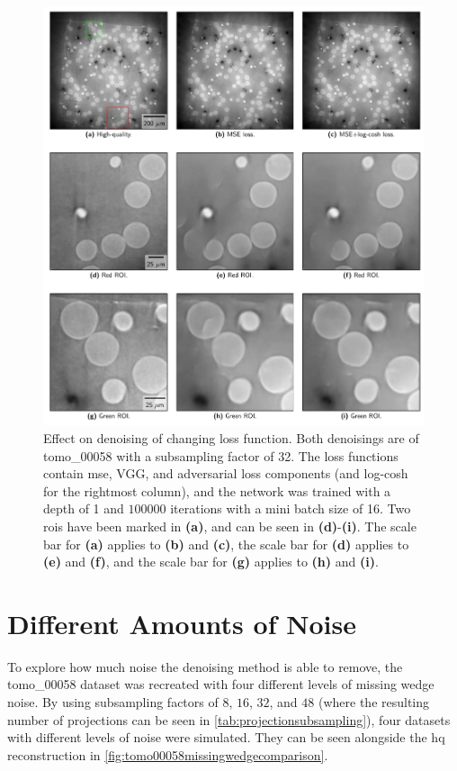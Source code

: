 \begin{figure}[htbp]
  \centering
  \includegraphics[width=.9\textwidth]{figures/losschangedenoisingcomparison.pdf}
  \caption[Effect on denoising of changing loss function]{Effect on denoising of changing loss function. Both denoisings are of tomo\_00058 with a subsampling factor of 32. The loss functions contain \acrshort{mse}, VGG, and adversarial loss components (and log-cosh for the rightmost column), and the network was trained with a depth of 1 and $100000$ iterations with a mini batch size of 16. Two \acrshort{roi}s have been marked in \textbf{(a)}, and can be seen in \textbf{(d)}-\textbf{(i)}. The scale bar for \textbf{(a)} applies to \textbf{(b)} and \textbf{(c)}, the scale bar for \textbf{(d)} applies to \textbf{(e)} and \textbf{(f)}, and the scale bar for \textbf{(g)} applies to \textbf{(h)} and \textbf{(i)}. }
  \label{fig:losschangedenoisingcomparison}
\end{figure}



\section{Different Amounts of Noise}
To explore how much noise the denoising method is able to remove, the tomo\_00058 dataset was recreated with four different levels of missing wedge noise. By using subsampling factors of $8$, $16$, $32$, and $48$ (where the resulting number of projections can be seen in \cref{tab:projectionsubsampling}), four datasets with different levels of noise were simulated. They can be seen alongside the \acrshort{hq} reconstruction in \cref{fig:tomo00058missingwedgecomparison}. 


